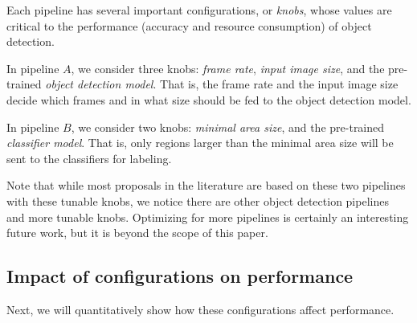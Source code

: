 Each pipeline has several important configurations, or {\em knobs},
whose values are critical to the performance (accuracy and resource consumption) of
object detection. 
\begin{packeditemize}
\item 
In pipeline $A$, we consider three knobs: {\em frame rate}, 
{\em input image size}, and the pre-trained 
{\em object detection model}. 
That is, the frame rate and the input image size decide which 
frames and in what size should be fed to the object detection model.
\item 
In pipeline $B$, we consider two knobs: {\em minimal area
size}, and the pre-trained {\em classifier model}.
That is, only regions larger than the minimal area size will be 
sent to the classifiers for labeling.
\end{packeditemize}

Note that while most proposals in the literature are based on these
two pipelines with these tunable knobs, we notice there are other 
object detection pipelines~\cite{??} and more tunable knobs.
Optimizing for more pipelines is certainly an interesting future 
work, but it is beyond the scope of this paper. 


\subsection{Impact of configurations on performance}
Next, we will quantitatively show how these configurations affect
performance.



